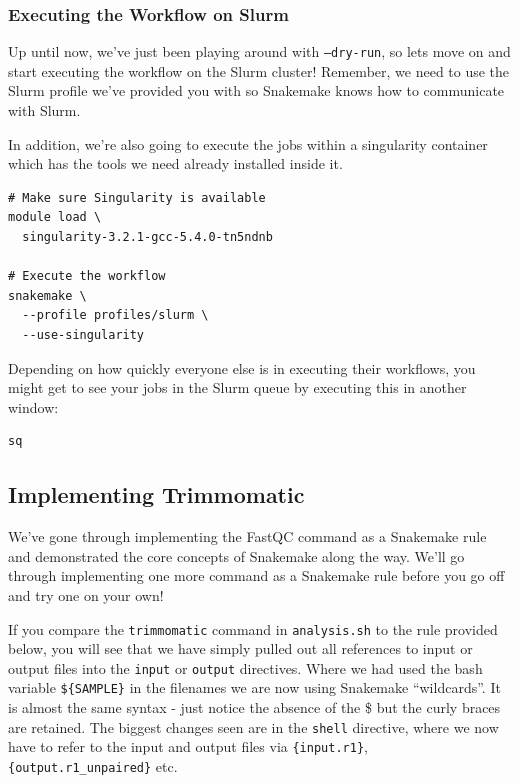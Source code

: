 \subsubsection{Executing the Workflow on Slurm}

Up until now, we've just been playing around with \texttt{--dry-run}, so lets move on and start executing the workflow on the Slurm cluster!
Remember, we need to use the Slurm profile we've provided you with so Snakemake knows how to communicate with Slurm.

In addition, we're also going to execute the jobs within a singularity container which has the tools we need already installed inside it.

\begin{lstlisting}
# Make sure Singularity is available
module load \
  singularity-3.2.1-gcc-5.4.0-tn5ndnb

# Execute the workflow
snakemake \
  --profile profiles/slurm \
  --use-singularity
\end{lstlisting}

Depending on how quickly everyone else is in executing their workflows, you might get to see your jobs in the Slurm queue by executing this in another window:

\begin{lstlisting}
sq
\end{lstlisting}

\subsection{Implementing Trimmomatic}

We've gone through implementing the FastQC command as a Snakemake rule and demonstrated the core concepts of
Snakemake along the way. We'll go through implementing one more command as a Snakemake rule before you go
off and try one on your own!

If you compare the \texttt{trimmomatic} command in \texttt{analysis.sh} to the rule provided below, you will
see that we have simply pulled out all references to input or output files into the \texttt{input} or
\texttt{output} directives. Where we had used the bash variable \texttt{\$\{SAMPLE\}} in the filenames we are now
using Snakemake ``wildcards''. It is almost the same syntax - just notice the absence of the \$ but the curly braces
are retained. The biggest changes seen are in the \texttt{shell} directive, where we now have to refer to the input
and output files via \texttt{\{input.r1\}}, \texttt{\{output.r1\_unpaired\}} etc.

